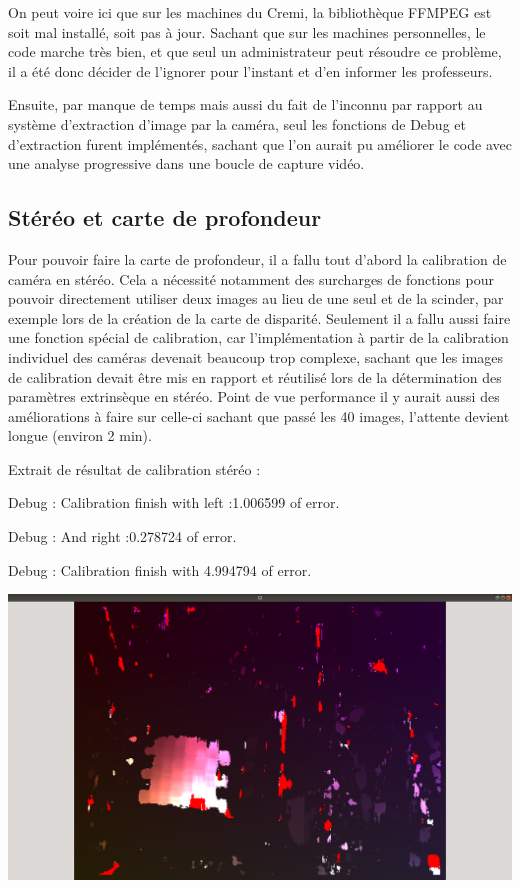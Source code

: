 \documentclass{article}
\begin{document}
On peut voire ici que sur les machines du Cremi, la bibliothèque FFMPEG est soit mal installé, soit pas à jour. Sachant que sur les machines personnelles, le code marche très bien, et que seul un administrateur peut résoudre ce problème, il a été donc décider de l'ignorer pour l'instant et d'en informer les professeurs.

Ensuite, par manque de temps mais aussi du fait de l'inconnu par rapport au système d'extraction d'image par la caméra, seul les fonctions de Debug et d'extraction furent implémentés, sachant que l'on aurait pu améliorer le code avec une analyse progressive dans une boucle de capture vidéo. 

\newpage
\subsection{Stéréo et carte de profondeur}

    
Pour pouvoir faire la carte de profondeur, il a fallu tout d'abord la calibration de caméra en stéréo.
Cela a nécessité notamment des surcharges de fonctions pour pouvoir directement utiliser deux images au lieu de une seul et de la scinder, par exemple lors de la création de la carte de disparité. Seulement il a fallu aussi faire une fonction spécial de calibration, car l'implémentation à partir de la calibration individuel des caméras devenait beaucoup trop complexe, sachant que les images de calibration devait être mis en rapport et réutilisé lors de la détermination des paramètres extrinsèque en stéréo.
Point de vue performance il y aurait aussi des améliorations à faire sur celle-ci sachant que passé les 40 images, l'attente devient longue (environ 2 min).


Extrait de résultat de calibration stéréo :

Debug :  Calibration finish with left :1.006599 of error. 

Debug :  And right :0.278724 of error. 

Debug :  Calibration finish with 4.994794 of error. 

\includegraphics[width=\linewidth]{img/d_bm.png}
\end{document}
